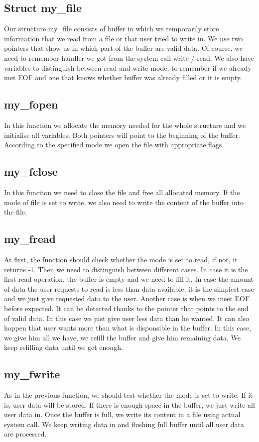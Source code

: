 \documentclass[a4paper,10pt]{article}
\begin{document}
\subsection{Struct my\_file}
 Our structure my\_file consists of buffer in which we temporarily store information that we read from a file or that user tried to write in. We use two pointers that show us in which part of the buffer are valid data. Of course, we need to remember handler we got from the system call write / read. We also have variables to distinguish between read and write mode, to remember if we already met EOF and one that knows whether buffer was already filled or it is empty.  
 \subsection{my\_fopen}
 In this function we allocate the memory needed for the whole structure and we initialise all variables. Both pointers will point to the beginning of the buffer. According to the specified mode we open the file with appropriate flags.
 \subsection{my\_fclose}
 In this function we need to close the file and free all allocated memory. If the mode of file is set to write, we also need to write the content of the buffer into the file.

 \subsection{my\_fread}
 At first, the function should check whether the mode is set to read, if not, it returns -1. Then we need to distinguish between different cases. In case it is the first read operation, the buffer is empty and we need to fill it. In case the amount of data the user requests to read is less than data available, it is the simplest case and we just give requested data to the user. Another case is when we meet EOF before expected. It can be detected thanks to the pointer that points to the end of valid data. In this case we just give user less data than he wanted. It can also happen that user wants more than what is disponsible in the buffer. In this case, we give him all we have, we refill the buffer and give him remaining data. We keep refilling data until we get enough.

 \subsection{my\_fwrite}
 As in the previous function, we should test whether the mode is set to write. If it is, user data will be stored. If there is enough space in the buffer, we just write all user data in. Once the buffer is full, we write its content in a file using actual system call. We keep writing data in and flushing full buffer until all user data are processed.
\end{document}
